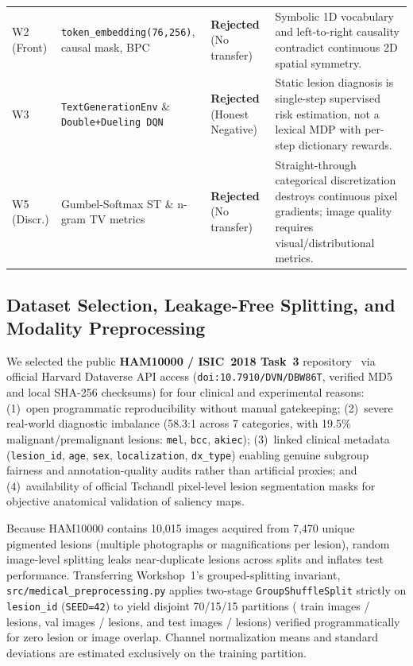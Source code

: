 \begin{table}[htbp]
\begin{tabular}{p{1.6cm}p{3.4cm}p{2.3cm}p{6.8cm}}
W2 (Front) & \texttt{token\_embedding(76,256)}, causal mask, BPC & \textbf{Rejected} (No transfer) & Symbolic 1D vocabulary and left-to-right causality contradict continuous 2D spatial symmetry. \\
W3 & \texttt{TextGenerationEnv} \& \texttt{Double+Dueling DQN} & \textbf{Rejected} (Honest Negative) & Static lesion diagnosis is single-step supervised risk estimation, not a lexical MDP with per-step dictionary rewards. \\
W5 (Discr.) & Gumbel-Softmax ST \& n-gram TV metrics & \textbf{Rejected} (No transfer) & Straight-through categorical discretization destroys continuous pixel gradients; image quality requires visual/distributional metrics. \\
\bottomrule
\end{tabular}
\end{table}

\subsection{Dataset Selection, Leakage-Free Splitting, and Modality Preprocessing}
We selected the public \textbf{HAM10000 / ISIC~2018 Task~3} repository~\cite{Tschandl2018dataset} via official Harvard Dataverse API access (\texttt{doi:10.7910/DVN/DBW86T}, verified MD5 and local SHA-256 checksums) for four clinical and experimental reasons: (1)~open programmatic reproducibility without manual gatekeeping; (2)~severe real-world diagnostic imbalance (58.3:1 across 7 categories, with 19.5\% malignant/premalignant lesions: \texttt{mel}, \texttt{bcc}, \texttt{akiec}); (3)~linked clinical metadata (\texttt{lesion\_id}, \texttt{age}, \texttt{sex}, \texttt{localization}, \texttt{dx\_type}) enabling genuine subgroup fairness and annotation-quality audits rather than artificial proxies; and (4)~availability of official Tschandl pixel-level lesion segmentation masks for objective anatomical validation of saliency maps.

Because HAM10000 contains 10,015 images acquired from 7,470 unique pigmented lesions (multiple photographs or magnifications per lesion), random image-level splitting leaks near-duplicate lesions across splits and inflates test performance. Transferring Workshop~1's grouped-splitting invariant, \texttt{src/medical\_preprocessing.py} applies two-stage \texttt{GroupShuffleSplit} strictly on \texttt{lesion\_id} (\texttt{SEED=42}) to yield disjoint 70/15/15 partitions (\WSixTrainImgs{} train images / \WSixTrainLesions{} lesions, \WSixValImgs{} val images / \WSixValLesions{} lesions, and \WSixTestImgs{} test images / \WSixTestLesions{} lesions) verified programmatically for zero lesion or image overlap. Channel normalization means and standard deviations are estimated exclusively on the training partition.

